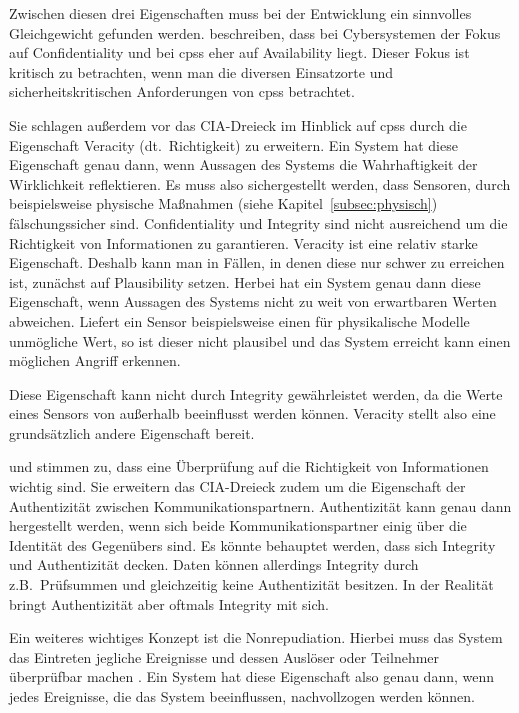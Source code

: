 \documentclass[final,bibliography=totocnumbered]{include/sikseminar}
\newcommand{\cps}{\glspl{cps}\xspace}
\begin{document}
Zwischen diesen drei Eigenschaften muss bei der Entwicklung ein sinnvolles Gleichgewicht gefunden werden.
\citeauthor{GK16} beschreiben, dass bei Cybersystemen der Fokus auf Confidentiality und bei \cps eher auf Availability liegt.
Dieser Fokus ist kritisch zu betrachten, wenn man die diversen Einsatzorte und sicherheitskritischen Anforderungen von \cps betrachtet.

Sie schlagen außerdem vor das CIA-Dreieck im Hinblick auf \cps durch die Eigenschaft Veracity (dt.~Richtigkeit) zu erweitern.
Ein System hat diese Eigenschaft genau dann, wenn Aussagen des Systems die Wahrhaftigkeit der  Wirklichkeit reflektieren.
Es muss also sichergestellt werden, dass Sensoren, durch beispielsweise physische Maßnahmen (siehe Kapitel~\ref{subsec:physisch}) fälschungssicher sind.
Confidentiality und Integrity sind nicht ausreichend um die Richtigkeit von Informationen zu garantieren.
Veracity ist eine relativ starke Eigenschaft.
Deshalb kann man in Fällen, in denen diese nur schwer zu erreichen ist, zunächst auf Plausibility setzen.
Herbei hat ein System genau dann diese Eigenschaft, wenn Aussagen des Systems nicht zu weit von erwartbaren Werten abweichen.
Liefert ein Sensor beispielsweise einen für physikalische Modelle unmögliche Wert, so ist dieser nicht plausibel und das System erreicht kann einen möglichen Angriff erkennen.~\cite{GK16}

Diese Eigenschaft kann nicht durch Integrity gewährleistet werden, da die Werte eines Sensors von außerhalb beeinflusst werden können.
Veracity stellt also eine grundsätzlich andere Eigenschaft bereit.

\citeauthor{WYX+10} und \citeauthor{SFJ17} stimmen zu, dass eine Überprüfung auf die Richtigkeit von Informationen wichtig sind.
Sie erweitern das CIA-Dreieck zudem um die Eigenschaft der Authentizität zwischen Kommunikationspartnern.
Authentizität kann genau dann hergestellt werden, wenn sich beide Kommunikationspartner einig über die Identität des Gegenübers sind.
Es könnte behauptet werden, dass sich Integrity und Authentizität decken.
Daten können allerdings Integrity durch z.B.\ Prüfsummen und gleichzeitig keine Authentizität besitzen.
In der Realität bringt Authentizität aber oftmals Integrity mit sich.

Ein weiteres wichtiges Konzept ist die Nonrepudiation. %
Hierbei muss das System das Eintreten jegliche Ereignisse und dessen Auslöser oder Teilnehmer überprüfbar machen \cite{CH13}.
Ein System hat diese Eigenschaft also genau dann, wenn jedes Ereignisse, die das System beeinflussen, nachvollzogen werden können. \label{def:nonrepudiation}
\end{document}
